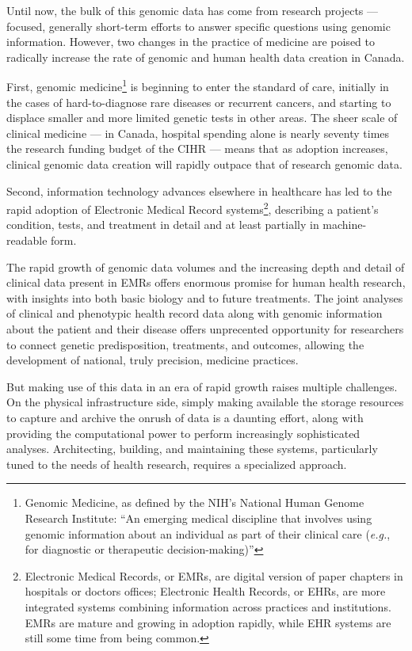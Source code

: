\documentclass[twoside,symmetric,sfsidenotes,notoc]{tufte-book}
\begin{document}
Until now, the bulk of this genomic data has come from research projects ---
focused, generally short-term efforts to answer specific questions using 
genomic information. However, two changes in the practice of medicine are
poised to radically increase the rate of genomic and human health data creation
in Canada.

First, genomic medicine\footnote{Genomic Medicine, as defined by the NIH's
National Human Genome Research Institute: ``An emerging medical discipline
that involves using genomic information about an individual as part of their
clinical care (\textit{e.g.}, for diagnostic or therapeutic decision-making)''} is beginning
to enter the standard of care, initially in the cases of hard-to-diagnose
rare diseases or recurrent cancers, and starting to displace smaller
and more limited genetic tests in other areas.  The sheer scale of clinical medicine 
--- in Canada, hospital spending alone is nearly seventy times the research funding
budget of the CIHR --- means that as adoption increases, clinical
genomic data creation will rapidly outpace that of research genomic data.

Second, information technology advances elsewhere in healthcare
has led to the rapid adoption of Electronic Medical Record systems\footnote{
Electronic Medical Records, or EMRs, are digital version of paper chapters
in hospitals or doctors offices; Electronic Health Records, or EHRs, are
more integrated systems combining information across practices and institutions.
EMRs are mature and growing in adoption rapidly, while EHR systems are still
some time from being common.}, describing a patient's condition, tests, and
treatment in detail and at least partially in machine-readable form.

The rapid growth of genomic data volumes and the increasing depth and detail
of clinical data present in EMRs offers enormous promise for human health research,
with insights into both basic biology and to future treatments.  The joint analyses
of clinical and phenotypic health record data along with genomic information 
about the patient and their disease offers unprecented opportunity for researchers
to connect genetic predisposition, treatments, and outcomes, allowing the
development of national, truly precision, medicine practices.

But making use of this data in an era of rapid growth raises multiple challenges.
On the physical infrastructure side, simply making available the storage 
resources to capture and archive the onrush of data is a daunting effort, along with
providing the computational power to perform increasingly sophisticated analyses.
Architecting, building, and maintaining these systems, particularly tuned to
the needs of health research, requires a specialized approach.
\end{document}
